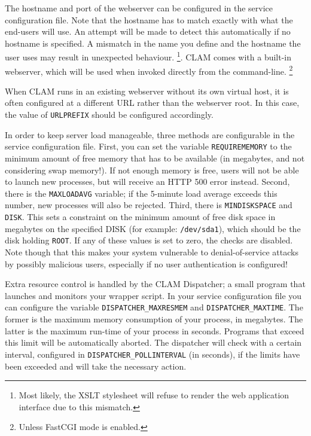 \documentclass[a4paper,12pt,twoside,openright]{report}
\begin{document}
The hostname and port of the webserver can be configured in the service
configuration file. Note that the hostname has to match exactly with what the
end-users will use. An attempt will be made to detect this automatically if no
hostname is specified. A mismatch in the name you define and the hostname the
user uses may result in unexpected behaviour. \footnote{Most likely, the XSLT
stylesheet will refuse to render the web application interface due to this
mismatch.}. CLAM comes with a built-in webserver, which will be used when
invoked directly from the command-line. \footnote{Unless FastCGI mode is
enabled.}

When CLAM runs in an existing webserver without its own virtual host, it is
often configured at a different URL rather than the webserver root. In this
case, the value of \texttt{URLPREFIX} should be configured accordingly.

In order to keep server load manageable, three methods are configurable in the
service configuration file. First, you can set the variable
\texttt{REQUIREMEMORY} to the minimum amount of free memory that has to be
available (in megabytes, and not considering swap memory!). If not enough
memory is free, users will not be able to launch new processes, but will
receive an HTTP 500 error instead. Second, there is the \texttt{MAXLOADAVG}
variable; if the 5-minute load average exceeds this number, new processes will
also be rejected. Third, there is \texttt{MINDISKSPACE} and \texttt{DISK}. This
sets a constraint on the minimum amount of free disk space in megabytes on the
specified DISK (for example: \texttt{/dev/sda1}), which should be the disk
holding \texttt{ROOT}. If any of these values is set to zero, the checks are
disabled. Note though that this makes your system vulnerable to
denial-of-service attacks by possibly malicious users, especially if no user
authentication is configured!

Extra resource control is handled by the CLAM Dispatcher; a small program that
launches and monitors your wrapper script. In your service configuration file
you can configure the variable \texttt{DISPATCHER\_MAXRESMEM} and
\texttt{DISPATCHER\_MAXTIME}. The former is the maximum memory consumption of
your process, in megabytes. The latter is the maximum run-time of your process
in seconds. Programs that exceed this limit will be automatically aborted. The
dispatcher will check with a certain interval, configured in
\texttt{DISPATCHER\_POLLINTERVAL} (in seconds), if the limits have been
exceeded and will take the necessary action.  
  
\end{document}
